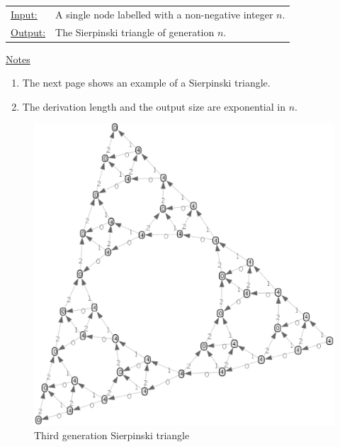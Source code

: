 \begin{tabular}{lp{10.5cm}}
\ul{Input:} & A single node labelled with a non-negative integer $n$. \\
\ul{Output:} & The Sierpinski triangle of generation $n$.
\end{tabular}
  
\begin{center}

\end{center}

\ul{Notes}
\begin{enumerate}
\setlength{\itemsep}{-.5ex}
\item The next page shows an example of a Sierpinski triangle.
\item The derivation length and the output size are exponential in $n$.
\end{enumerate}

\begin{figure}[p]
 \begin{center}
  \includegraphics[scale=.45,angle=-15]{sierpinski-3.eps}
 \end{center}
\vspace*{-2.5cm}
\caption{Third generation Sierpinski triangle \label{fig:sierpinski}}
\end{figure}


